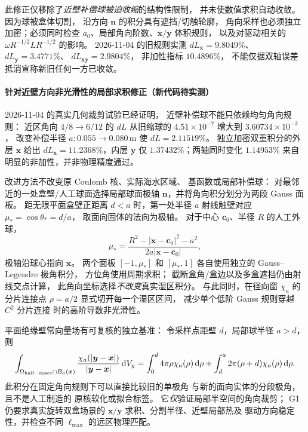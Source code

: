 此修正仅移除了\emph{近壁补偿球被迫收缩}的结构性限制，
并未使数值求积自动收敛。因为球被盒体切割，
沿方向 \(\bm n\) 的积分具有遮挡/切触轮廓，
角向采样也必须独立加密；必须同时检查
\(a_0\)、局部角向阶数、\(\bm x/\bm y\) 体积规则，
以及对驱动相关的 \(\omega R^{-1/2}LR^{-1/2}\) 的影响。
2026-11-04 的旧规则实测
\(dL_{\bm x}=9.8049\%\)、\(dL_{\bm y}=3.4771\%\)、
\(dL_{\bm x\bm y}=2.9804\%\)，
非加性指标 \(10.4896\%\)，
不能仅据双轴误差抵消宣称新旧任何一方已收敛。

\paragraph{针对近壁方向非光滑性的局部求积修正（新代码待实测）}
2026-11-04 的真实几何裁剪试验已经证明，
近壁补偿球不能只依赖均匀角向规则：
近区角向 \(4/8\to6/12\) 的 \(dL\) 从旧缩球的
\(4.51\times 10^{-7}\) 增大到 \(3.60734\times10^{-3}\)，
改变补偿半径 \(a:0.055\to0.080\,\mathrm m\)
使 \(dL=2.11519\%\)。
独立加密双重积分的外层 \(\bm x\) 给出
\(dL_{\bm x}=11.2368\%\)，内层 \(\bm y\) 仅
\(1.37432\%\)；两轴同时变化 \(1.14953\%\)
来自明显的非加性，并非物理精度通过。

改进方法不改变原 Coulomb 核、实际海水区域、
基函数或局部补偿球：
对最邻近的一处盒壁/人工球面选择局部球面极轴
\(\bm n\)，并将角向积分划分为两段 Gauss 面板。
距无限平面盒壁正距离 \(d<a\) 时，第一处半径
\(a\) 射线触壁对应 \(\mu_*=\cos\theta_*=d/a\)，
取面向固体的法向为极轴。
对于中心 \(\bm c_0\)、半径 \(R\) 的人工外球，
\[
\mu_*=\frac{R^2-|\bm x-\bm c_0|^2-a^2}
{2a|\bm x-\bm c_0|},
\]
极轴沿球心指向 \(\bm x\)。
两个面板 \([-1,\mu_*]\) 和 \([\mu_*,1]\)
各自使用独立的 Gauss--Legendre 极角积分，
方位角使用周期求积；
截断盒角/盒边以及多盒遮挡仍由射线交点计算，
此角向坐标选择\emph{不改变}真实湿区积分。
与此同时，在径向窗 \(\chi_a\) 的分片连接点
\(\rho=a/2\) 显式切开每一个湿区区间，
减少单个低阶 Gauss 规则穿越 \(C^2\) 分片连接
时的高阶导数非光滑性。

平面绝缘壁常向量场有可复核的独立基准：
令采样点距壁 \(d\)，局部球半径 \(a>d\)，则
\[
\int_{\Omega_{\rm half-space}\cap B_a(\bm x)}
\frac{\chi_a(|\bm y-\bm x|)}
{|\bm y-\bm x|}\,\mathrm dV_y
=\int_0^d 4\pi\rho\chi_a(\rho)\,\mathrm d\rho
+\int_d^a 2\pi(\rho+d)\chi_a(\rho)\,\mathrm d\rho .
\]
此积分在固定角向规则下可以直接比较旧的单极角
与新的面向实体的分段极角，且不是人工制造的
原核软化或拟合标签。
它\emph{仅}验证局部半空间的角向裁剪；
G1 仍要求真实旋转双盒场景的
\(\bm x/\bm y\) 求积、分割半径、近壁局部热及
驱动方向稳定性，并检查不同 \(\ell_{\max}\)
的远区物理匹配。


